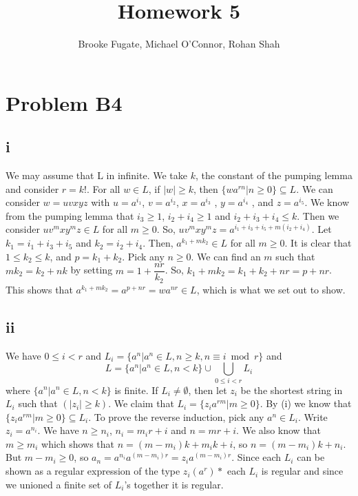 \documentclass[12pt]{article}
\begin{document}
\pagestyle{plain}
\titleformat{\subsection}[runin]
  {\normalfont\large\bfseries}{\thesubsection}{1em}{}

\title{Homework 5}
\author{Brooke Fugate, Michael O'Connor, Rohan Shah}
\date{}

\maketitle

\section*{Problem B4}
\subsection*{i}
We may assume that L in infinite. We take $k$, the constant of the pumping lemma and consider $r = k!$. For all $w \in L$, if $|w| \ge k$, then $\{wa^{rn} | n \ge 0 \} \subseteq L$. \newline 
We can consider $w=uvxyz$ with $u=a^{i_1}$, $v=a^{i_2}$, $x=a^{i_3}$ , $y=a^{i_4}$ , and $z=a^{i_5}$. We know from the pumping lemma that $i_3 \ge 1$, $i_2 + i_4 \ge 1$ and $i_2 + i_3 + i_4 \le k$. Then we consider $uv^mxy^mz \in L$ for all $m \ge 0$.  So, $uv^mxy^mz = a^{i_1+i_3+i_5 + m(i_2 + i_4)}$. Let $k_1 = i_1 + i_3 + i_5$ and $k_2 = i_2 + i_4$. Then, $a^{k_1 + mk_2} \in L$ for all $m \ge 0$. It is clear that $1 \le k_2 \le k$, and $p=k_1+k_2$. Pick any $n \ge 0$. We can find an $m$ such that $mk_2=k_2 +nk$ by setting $m=1+ \dfrac{nr}{k_2}$. So, $k_1+mk_2=k_1+k_2+nr=p+nr$. This shows that $a^{k_1+mk_2}=a^{p+nr}=wa^{nr} \in L$, which is what we set out to show. 
\subsection*{ii}
We have $0 \le i < r$ and $L_i = \{a^n |a^n \in L, n \ge k , n \equiv i \bmod r \}$ and 
$$L = \{ a^n | a^n \in L , n < k\} \cup \bigcup_{0 \le i < r} L_i$$ where $\{ a^n | a^n \in L , n < k\}$ is finite. If $L_i \neq \emptyset$, then let $z_i$ be the shortest string in $L_i$ such that $(|z_i| \ge k)$. We claim that $L_i = \{z_i a^{rm} | m \ge 0\}$. By (i) we know that $\{z_i a^{rm} | m \ge 0\} \subseteq L_i$. To prove the reverse induction, pick any $a^n \in L_i$. Write $z_i = a^{n_i}$. We have $n \ge n_i$, $n_i = m_ir + i$ and $n=mr +i$. We also know that $m \ge m_i$ which shows that $n=(m-m_i)k + m_ik + i$, so $n=(m-m_i)k + n_i$. But $m-m_i \ge 0$, so $a_n=a^{n_i}a^{(m-m_i)r}=z_ia^{(m-m_i)r}$.  Since each $L_i$ can be shown as a regular expression of the type $z_i(a^r)*$ each $L_i$ is regular and since we unioned a finite set of $L_i$'s together it is regular.
\end{document}
